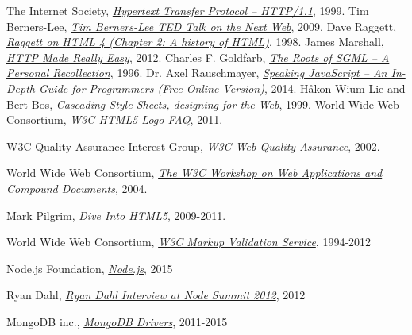 \renewcommand{\bibname}{References}
\begin{thebibliography}{99}

  The Internet Society,
  \emph{\href{http://tools.ietf.org/html/rfc2616}{Hypertext Transfer Protocol -- HTTP/1.1}},  
  1999.
  Tim Berners-Lee,
  \emph{\href{http://www.ted.com/talks/tim_berners_lee_on_the_next_web?language=en}{Tim Berners-Lee TED Talk on the Next Web}},  
  2009.
  Dave Raggett,
  \emph{\href{http://www.w3.org/People/Raggett/book4/ch02.html}{Raggett on HTML 4 (Chapter 2: A history of HTML)}},  
  1998.
  James Marshall,
  \emph{\href{http://www.jmarshall.com/easy/http/}{HTTP Made Really Easy}},  
  2012.
Charles F. Goldfarb,
\emph{\href{http://www.sgmlsource.com/history/roots.htm}{The Roots of SGML -- A Personal Recollection}},  
1996.
Dr. Axel Rauschmayer,
\emph{\href{http://speakingjs.com/es5/}{Speaking JavaScript -- An In-Depth Guide for Programmers (Free Online Version)}},  
2014.
Håkon Wium Lie and Bert Bos,
\emph{\href{http://www.w3.org/Style/LieBos2e/history/Overview.html}{Cascading Style Sheets, designing for the Web}},  
1999.
World Wide Web Consortium,
\emph{\href{http://www.w3.org/html/logo/faq.html}{W3C HTML5 Logo FAQ}},  
2011.

W3C Quality Assurance Interest Group,
\emph{\href{http://www.w3.org/QA/2002/04/Web-Quality}{W3C Web Quality Assurance}},  
2002.

World Wide Web Consortium,
\emph{\href{http://www.w3.org/2004/04/webapps-cdf-ws/}{The W3C Workshop on Web Applications and Compound Documents}},  
2004.

Mark Pilgrim,
\emph{\href{http://diveintohtml5.info/index.html}{Dive Into HTML5}},  
2009-2011.

World Wide Web Consortium,
\emph{\href{https://validator.w3.org/}{W3C Markup Validation Service}},  
1994-2012

Node.js Foundation,
\emph{\href{https://nodejs.org/}{Node.js}},  
2015

Ryan Dahl,
\emph{\href{https://youtu.be/Fc26auhSLqM?t=1m32s}{Ryan Dahl Interview at Node Summit 2012}},  
2012

MongoDB inc.,
\emph{\href{http://docs.mongodb.org/ecosystem/drivers/}{MongoDB Drivers}},  
2011-2015


\end{thebibliography}